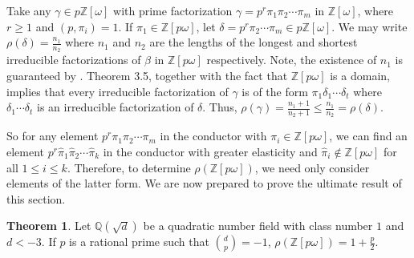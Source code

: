 \documentclass{amsart}
\theoremstyle{definition}
\newtheorem{thm}[lem]{Theorem}
\newcommand{\bbz}{\mathbb{Z}}
\newcommand{\bbq}{\mathbb{Q}}
\renewcommand{\geq}{\geqslant}
\renewcommand{\leq}{\leqslant}
\numberwithin{equation}{section}
\begin{document}
Take any $\gamma \in p\bbz[\omega]$ with prime factorization $\gamma = p^r \pi_1 \pi_2 \dotsm \pi_m$ in $\bbz[\omega]$, where $r \geq 1$ and $(p, \pi_i) = 1$. If $\pi_1 \in \bbz[p\omega]$, let $\delta = p^r \pi_2\dotsm \pi_m \in p\bbz[\omega]$. We may write $\rho(\delta) = \frac{n_1}{n_2}$ where $n_1$ and $n_2$ are the lengths of the longest and shortest irreducible factorizations of $\beta$ in $\bbz[p\omega]$ respectively. Note, the existence of $n_1$ is guaranteed by \cite{halter1995elasticity}. Theorem 3.5, together with the fact that $\bbz[p\omega]$ is a domain, implies that every irreducible factorization of $\gamma$ is of the form $\pi_1\delta_1\dotsm \delta_t$ where $\delta_1\dotsm \delta_t$ is an irreducible factorization of $\delta$. Thus, $\rho(\gamma) = \frac{n_1 + 1}{n_2 + 1} \leq \frac{n_1}{n_2} = \rho(\delta)$.

So for any element $p^r \pi_1 \pi_2 \dotsm \pi_m$ in the conductor with $\pi_i \in \bbz[p\omega]$, we can find an element $p^r \hat{\pi}_1 \hat{\pi}_2 \dotsm \hat{\pi}_k$ in the conductor with greater elasticity and $\hat{\pi}_i \notin \bbz[p\omega]$ for all $1 \leq i \leq k$. Therefore, to determine $\rho(\bbz[p\omega])$, we need only consider elements of the latter form. We are now prepared to prove the ultimate result of this section.

\begin{thm}
    Let $\bbq(\sqrt{d})$ be a quadratic number field with class number $1$ and $d < -3$. If $p$ is a rational prime such that $\binom{d}{p} = -1$, $\rho(\bbz[p\omega]) = 1 + \frac{p}{2}$.
\end{thm}
\end{document}
